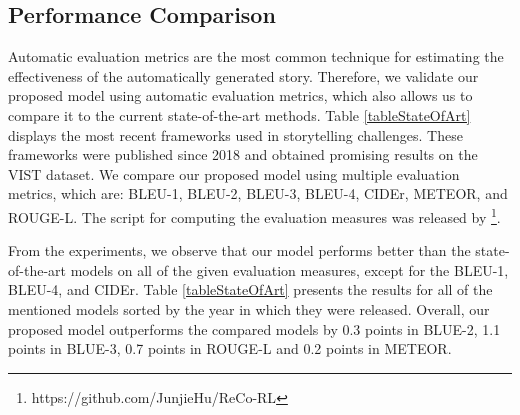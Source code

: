 \documentclass[runningheads]{llncs}
\begin{document}
\subsection{Performance Comparison}
Automatic evaluation metrics are the most common technique for estimating the effectiveness of the automatically generated story. Therefore, we validate our proposed model using automatic evaluation metrics, which also allows us to compare it to the current state-of-the-art methods. Table \ref{tableStateOfArt} displays the most recent frameworks used in storytelling challenges. These frameworks were published since 2018 and obtained promising results on the VIST dataset. We compare our proposed model using multiple evaluation metrics, which are: BLEU-1, BLEU-2, BLEU-3, BLEU-4, CIDEr, METEOR, and ROUGE-L. The script for computing the evaluation measures was released by \cite{hu2020makes}\footnote{https://github.com/JunjieHu/ReCo-RL}.

From the experiments, we observe that our model performs better than the state-of-the-art models on all of the given evaluation measures, except for the BLEU-1, BLEU-4, and CIDEr. Table \ref{tableStateOfArt} presents the results for all of the mentioned models sorted by the year in which they were released. Overall, our proposed model outperforms the compared models by 0.3 points in BLUE-2, 1.1 points in BLUE-3, 0.7 points in ROUGE-L and 0.2 points in METEOR.
\end{document}
